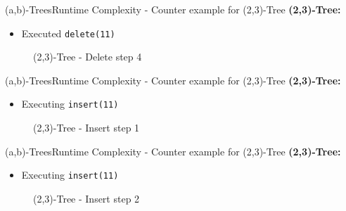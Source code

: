 
\begin{frame}{(a,b)-Trees}{Runtime Complexity - Counter example for (2,3)-Tree}
  \textbf{(2,3)-Tree:}
  \begin{itemize}
    \item
      Executed \texttt{\color{Mittel-Blau}delete(11)}
  \end{itemize}
  \begin{figure}
    \begin{adjustbox}{width=0.6\linewidth}
      
    \end{adjustbox}
    \label{fig:a_b_tree:2_3_tree_5}
    \caption{(2,3)-Tree - Delete step 4}
  \end{figure}
\end{frame}


\begin{frame}{(a,b)-Trees}{Runtime Complexity - Counter example for (2,3)-Tree}
  \textbf{(2,3)-Tree:}
  \begin{itemize}
    \item<2->
      Executing \texttt{\color{Mittel-Blau}insert(11)}
  \end{itemize}
  \begin{figure}
    \begin{adjustbox}{width=0.7\linewidth}
      
    \end{adjustbox}
    \label{fig:a_b_tree:2_3_tree_6}
    \caption{(2,3)-Tree - Insert step 1}
  \end{figure}
\end{frame}


\begin{frame}{(a,b)-Trees}{Runtime Complexity - Counter example for (2,3)-Tree}
  \textbf{(2,3)-Tree:}
  \begin{itemize}
    \item
      Executing \texttt{\color{Mittel-Blau}insert(11)}
  \end{itemize}
  \begin{figure}
    \begin{adjustbox}{width=0.7\linewidth}
      
    \end{adjustbox}
    \label{fig:a_b_tree:2_3_tree_7}
    \caption{(2,3)-Tree - Insert step 2}
  \end{figure}
\end{frame}


